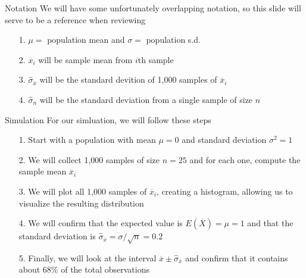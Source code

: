 \documentclass{beamer}
\begin{document}
\begin{frame}{Notation}
We will have some unfortunately overlapping notation, so this slide will serve to be a reference when reviewing
\begin{itemize}
  \item[1.] $\mu =$ population mean and $\sigma = $ population s.d.
  \item[2.] $\overline{x}_i$ will be sample mean from $i$th sample
  \item[3.] $\hat{\sigma}_{\overline{x}}$ will be the standard devition of 1,000 samples of $\overline{x}_i$
  \item[4.] $\hat{\sigma}_n$ will be the standard deviation from a single sample of size $n$
\end{itemize}
\end{frame}


\begin{frame}{Simulation}
For our simluation, we will follow these steps \vspace{3mm}

\begin{itemize}
\item[1.] Start with a population with mean $\mu = 0$ and standard deviation $\sigma^2 = 1$
\item[2.] We will collect 1,000 samples of size $n = 25$ and for each one,  compute the sample mean $\overline{x}_i$
\item[3.] We will plot all 1,000 samples of $\overline{x}_i$, creating a histogram, allowing us to visualize the resulting distribution
\item[4.] We will confirm that the expected value is $E(\overline{X}) = \mu = 1$ and that the standard deviation is $\hat{\sigma}_{\overline{x}} = \sigma/\sqrt{n} = 0.2$
\item[5.] Finally, we will look at the interval $\overline{x} \pm \hat{\sigma}_{\overline{x}}$ and confirm that it contains about 68\% of the total observations
\end{itemize}

\end{frame}
\end{document}
